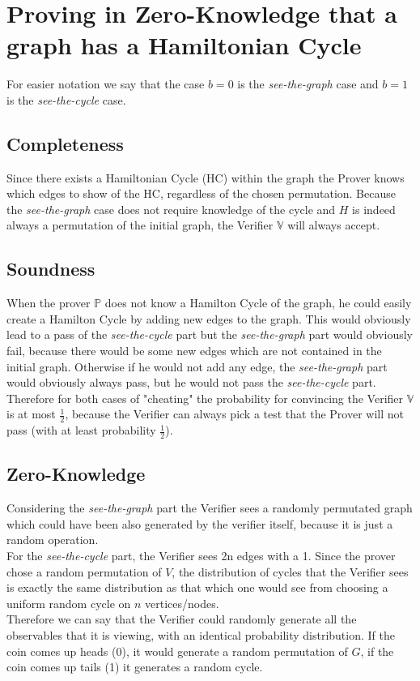 \documentclass{report}
\begin{document}
	\section{Proving in Zero-Knowledge that a graph has a Hamiltonian Cycle}
	\startsection
		For easier notation we say that the case $b=0$ is the \textit{see-the-graph} case and $b=1$ is the \textit{see-the-cycle} case.
		\subsection{Completeness}
		\startsubsection
			Since there exists a Hamiltonian Cycle (HC) within the graph the Prover knows which edges to show of the HC, regardless of the chosen permutation. Because the \textit{see-the-graph} case does not require knowledge of the cycle and $H$ is indeed always a permutation of the initial graph, the Verifier $\mathbb{V}$ will always accept.
		\closesection
		\subsection{Soundness}
		\startsubsection
			When the prover $\mathbb{P}$ does not know a Hamilton Cycle of the graph, he could easily create a Hamilton Cycle by adding new edges to the graph. This would obviously lead to a pass of the \textit{see-the-cycle} part but the \textit{see-the-graph} part would obviously fail, because there would be some new edges which are not contained in the initial graph. Otherwise if he would not add any edge, the \textit{see-the-graph} part would obviously always pass, but he would not pass the \textit{see-the-cycle} part. Therefore for both cases of "cheating" the probability for convincing the Verifier $\mathbb{V}$ is at most $\frac{1}{2}$, because the Verifier can always pick a test that the Prover will not pass (with at least probability $\frac{1}{2}$).
		\closesection
		\subsection{Zero-Knowledge}
		\startsubsection
			Considering the \textit{see-the-graph} part the Verifier sees a randomly permutated graph which could have been also generated by the verifier itself, because it is just a random operation. \\
			For the \textit{see-the-cycle} part, the Verifier sees 2n edges with a 1. Since the prover chose a random permutation of $V$, the distribution of cycles that the Verifier sees is exactly the same distribution as that which one would see from choosing a uniform random cycle on $n$ vertices/nodes. \\
			Therefore we can say that the Verifier could randomly generate all the observables that it is viewing, with an identical probability distribution. If the coin comes up heads (0), it would generate a random permutation of $G$, if the coin comes up tails (1) it generates a random cycle.
		\closesection
	\closesection
	
\end{document}
